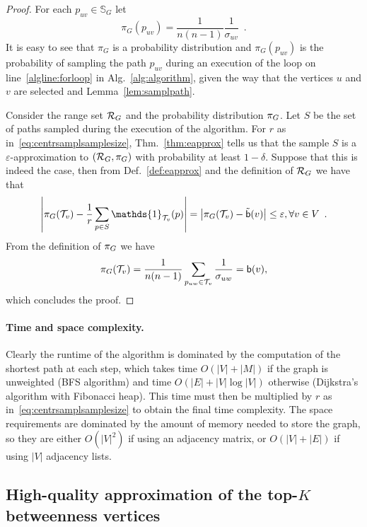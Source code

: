 \begin{proof}
  For each $p_{uv}\in\mathbb{S}_G$ let
  \[
  \pi_G(p_{uv})=\frac{1}{n(n-1)}\frac{1}{\sigma_{uv}}\enspace.
  \]
  It is easy to see that $\pi_G$ is a probability distribution and
  $\pi_G(p_{uv})$ is the probability of sampling the path $p_{uv}$ during an
  execution of the loop on line~\ref{algline:forloop} in
  Alg.~\ref{alg:algorithm}, given the way that the vertices $u$ and $v$ are
  selected and Lemma~\ref{lem:samplpath}.
  
  Consider the range set $\mathcal{R}_G$ and the probability distribution $\pi_G$.
  Let $S$ be the set of paths sampled during the execution of the algorithm.
  For $r$ as in~\eqref{eq:centrsamplsamplesize}, Thm.~\ref{thm:eapprox} tells us that the sample $S$ is a
  $\varepsilon$-approximation to $(\mathcal{R}_G,\pi_G)$ with probability at least
  $1-\delta$. Suppose that this is indeed the case, then from
  Def.~\ref{def:eapprox} and the definition of $\mathcal{R}_G$ we have that
  \[
  \left|\prob_G(\mathcal{T}_v) - \frac{1}{r}\sum_{p\in
  S}\mathds{1}_{\mathcal{T}_v}(p)\right|=\left|\prob_G(\mathcal{T}_v) -
  \tilde\betw(v)\right|\le\varepsilon, \forall v\in
  V\enspace.
  \]
  From the definition of $\pi_G$ we have
  \[
  \pi_G(\mathcal{T}_v)=\frac{1}{n(n-1)}\sum_{p_{uw}\in\mathcal{T}_v}\frac{1}{\sigma_{uw}}=\mathsf{b}(v),
  \]
  which concludes the proof.
\end{proof}

\ifproof
\paragraph{Time and space complexity.} Clearly the runtime of the algorithm is
dominated by the computation of the shortest path at each step, which takes time
$O(|V|+|M|)$ if the graph is unweighted (BFS algorithm) and time
$O(|E|+|V|\log|V|)$ otherwise (Dijkstra's algorithm with Fibonacci heap).
This time must then be multiplied by $r$ as in~\eqref{eq:centrsamplsamplesize} to obtain
the final time complexity. The space requirements are dominated by the amount of
memory needed to store the graph, so they are either $O(|V|^2)$ if using an
adjacency matrix, or $O(|V|+|E|)$ if using $|V|$ adjacency lists.
\fi

\subsection{High-quality approximation of the top-$K$ betweenness
vertices}\label{sec:centrsampltopk}

